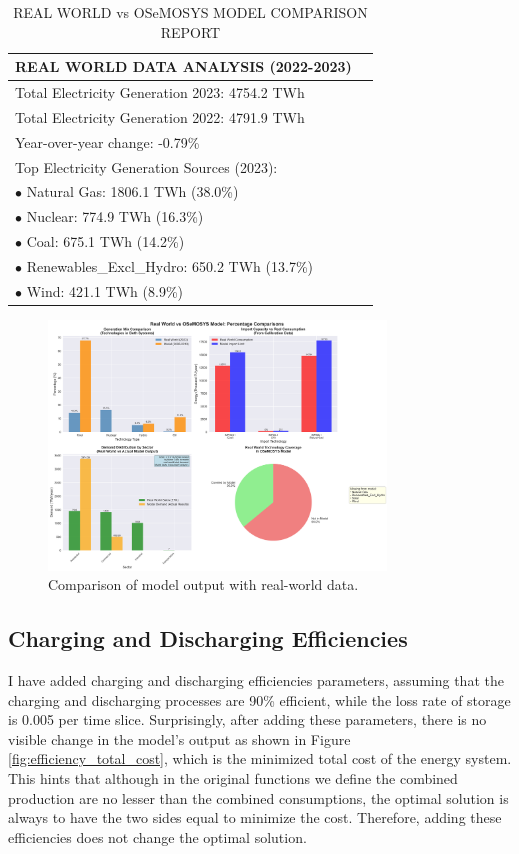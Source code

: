 \documentclass[11pt]{article}
\begin{document}
\begin{table}[H]
    \centering
    \begin{tabular}{ll}
        \toprule
        REAL WORLD DATA ANALYSIS (2022-2023) \\
        \midrule
        Total Electricity Generation 2023: 4754.2 TWh \\
        Total Electricity Generation 2022: 4791.9 TWh \\
        Year-over-year change: -0.79\% \\
        \midrule
        Top Electricity Generation Sources (2023): \\
         $\bullet$ Natural Gas: 1806.1 TWh (38.0\%) \\
         $\bullet$ Nuclear: 774.9 TWh (16.3\%) \\
         $\bullet$ Coal: 675.1 TWh (14.2\%) \\
         $\bullet$ Renewables\_Excl\_Hydro: 650.2 TWh (13.7\%) \\
         $\bullet$ Wind: 421.1 TWh (8.9\%) \\
        \bottomrule
    \end{tabular}
    \caption{REAL WORLD vs OSeMOSYS MODEL COMPARISON REPORT}
\end{table}

\begin{figure}[H]
    \centering
    \includegraphics[width=0.8\textwidth]{comparison_output/real_world_vs_model_comparison.png}
    \caption{Comparison of model output with real-world data.}
    \label{fig:real_world_comparison}
\end{figure}

\subsection{Charging and Discharging Efficiencies}
I have added charging and discharging efficiencies parameters, assuming that the charging and discharging processes are 90\% efficient, while the loss rate of storage is 0.005 per time slice. Surprisingly, after adding these parameters, there is no visible change in the model's output as shown in Figure \ref{fig:efficiency_total_cost}, which is the minimized total cost of the energy system. This hints that although in the original functions we define the combined production are no lesser than the combined consumptions, the optimal solution is always to have the two sides equal to minimize the cost. Therefore, adding these efficiencies does not change the optimal solution.
\end{document}

